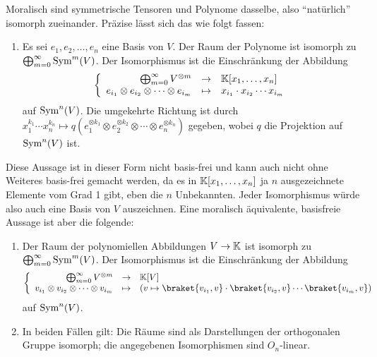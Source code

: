 \begin{theorem}
Moralisch sind symmetrische Tensoren und Polynome dasselbe, also \enquote{natürlich} isomorph zueinander. Präzise lässt sich das wie folgt fassen:
\begin{enumerate}
\item Es sei $e_1, e_2, \ldots, e_n$ eine Basis von $V$. Der Raum der Polynome ist isomorph zu $\bigoplus_{m=0}^\infty \operatorname{Sym}^m(V)$. Der Isomorphismus ist die Einschränkung der Abbildung
\[\left\lbrace\begin{array}{rcl}
\bigoplus_{m=0}^\infty V^{\otimes m} &\to& \mathbb{K}[x_1,\ldots,x_n] \\
e_{i_1} \otimes e_{i_2} \otimes \cdots \otimes e_{i_m} &\mapsto& x_{i_1}\cdot x_{i_2} \cdots x_{i_m}
\end{array}\right.\]
auf $\operatorname{Sym}^n(V)$. Die umgekehrte Richtung ist durch $x_1^{k_1} \cdots x_n^{k_n} \mapsto q(e_1^{\otimes k_1} \otimes e_2^{\otimes k_2} \otimes \cdots \otimes e_n^{\otimes k_n})$ gegeben, wobei $q$ die Projektion auf $\operatorname{Sym}^n(V)$ ist.
\end{enumerate}
\smallbreak
Diese Aussage ist in dieser Form nicht basis-frei und kann auch nicht ohne Weiteres basis-frei gemacht werden, da es in $\mathbb{K}[x_1, \ldots, x_n]$ ja $n$ ausgezeichnete Elemente vom Grad 1 gibt, eben die $n$ Unbekannten. Jeder Isomorphismus würde also auch eine Basis von $V$ auszeichnen.
\smallbreak
Eine moralisch äquivalente, basisfreie Aussage ist aber die folgende:
\begin{enumerate}[resume]
\item Der Raum der polynomiellen Abbildungen $V\to\mathbb{K}$ ist isomorph zu $\bigoplus_{m=0}^\infty \operatorname{Sym}^m(V)$. Der Isomorphismus ist die Einschränkung der Abbildung
\[\left\lbrace\begin{array}{rcl}
\bigoplus_{m=0}^\infty V^{\otimes m} &\to& \IK[V] \\
v_{i_1} \otimes v_{i_2} \otimes \cdots \otimes v_{i_m} &\mapsto& (v\mapsto \braket{v_{i_1},v} \cdot \braket{v_{i_2},v} \cdots \braket{v_{i_m},v})
\end{array}\right. \]
auf $\operatorname{Sym}^n(V)$.
\item In beiden Fällen gilt: Die Räume sind als Darstellungen der orthogonalen Gruppe isomorph; die angegebenen Isomorphismen sind $O_n$-linear.
\end{enumerate}
\end{theorem}
